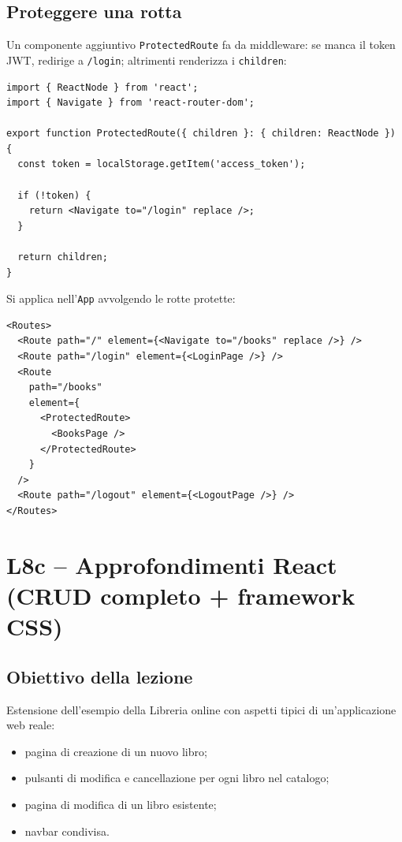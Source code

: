 \documentclass[11pt,a4paper]{article}
\begin{document}
\subsection{Proteggere una rotta}

Un componente aggiuntivo \texttt{ProtectedRoute} fa da middleware: se manca il token JWT, redirige a \texttt{/login}; altrimenti renderizza i \texttt{children}:

\begin{lstlisting}[language=tsx]
import { ReactNode } from 'react';
import { Navigate } from 'react-router-dom';

export function ProtectedRoute({ children }: { children: ReactNode }) {
  const token = localStorage.getItem('access_token');

  if (!token) {
    return <Navigate to="/login" replace />;
  }

  return children;
}
\end{lstlisting}

Si applica nell'\texttt{App} avvolgendo le rotte protette:

\begin{lstlisting}[language=tsx]
<Routes>
  <Route path="/" element={<Navigate to="/books" replace />} />
  <Route path="/login" element={<LoginPage />} />
  <Route
    path="/books"
    element={
      <ProtectedRoute>
        <BooksPage />
      </ProtectedRoute>
    }
  />
  <Route path="/logout" element={<LogoutPage />} />
</Routes>
\end{lstlisting}

\section{L8c -- Approfondimenti React (CRUD completo + framework CSS)}

\subsection{Obiettivo della lezione}

Estensione dell'esempio della Libreria online con aspetti tipici di un'applicazione web reale:
\begin{itemize}[leftmargin=*]
    \item pagina di creazione di un nuovo libro;
    \item pulsanti di modifica e cancellazione per ogni libro nel catalogo;
    \item pagina di modifica di un libro esistente;
    \item navbar condivisa.
\end{itemize}
\end{document}
